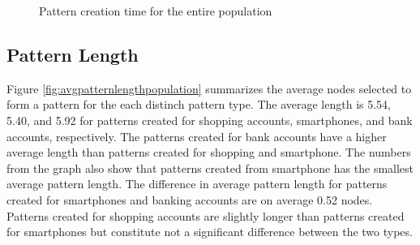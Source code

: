 		\begin{figure}[H]
      \caption{Pattern creation time for the entire population}
      \label{fig:patterncreationtimepopulation}
    \end{figure}

  \clearpage
	\subsection{Pattern Length}

    Figure \ref{fig:avgpatternlengthpopulation} summarizes the average nodes selected to form a pattern for the each distinch pattern type. The average length is 5.54, 5.40, and 5.92 for patterns created for shopping accounts, smartphones, and bank accounts, respectively. The patterns created for bank accounts have a higher average length than patterns created for shopping and smartphone. The numbers from the graph also show that patterns created from smartphone has the smallest average pattern length. The difference in average pattern length for patterns created for smartphones and banking accounts are on average 0.52 nodes. Patterns created for shopping accounts are slightly longer than patterns created for smartphones but constitute not a significant difference between the two types.

